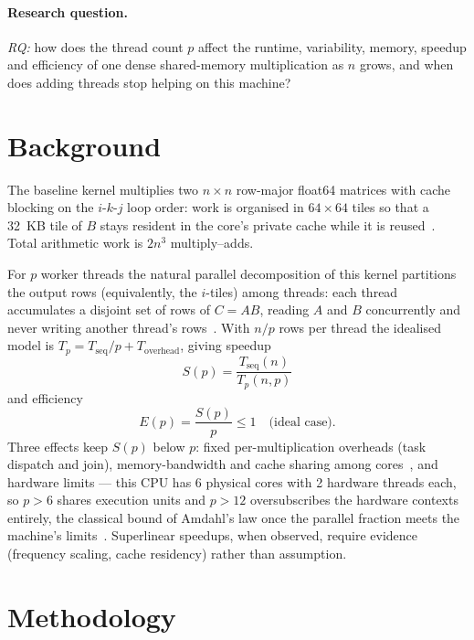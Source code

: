 \documentclass[11pt,a4paper]{article}
\begin{document}
\paragraph{Research question.}
\emph{RQ:} how does the thread count $p$ affect the runtime, variability,
memory, speedup and efficiency of one dense shared-memory multiplication as
$n$ grows, and when does adding threads stop helping on this machine?

\section{Background}
\label{sec:background}

The baseline kernel multiplies two $n \times n$ row-major float64 matrices
with cache blocking on the $i$-$k$-$j$ loop order: work is organised in
$64 \times 64$ tiles so that a 32~KB tile of $B$ stays resident in the
core's private cache while it is reused~\cite{lam1991,hennessy2017}. Total
arithmetic work is $2n^3$ multiply--adds.

For $p$ worker threads the natural parallel decomposition of this kernel
partitions the output rows (equivalently, the $i$-tiles) among threads:
each thread accumulates a disjoint set of rows of $C = AB$, reading $A$ and
$B$ concurrently and never writing another thread's
rows~\cite{lea2006}. With $n/p$ rows per thread the idealised model is
$T_p = T_{\mathrm{seq}}/p + T_{\mathrm{overhead}}$, giving speedup
\begin{equation}
S(p) = \frac{T_{\mathrm{seq}}(n)}{T_p(n, p)}
\end{equation}
and efficiency
\begin{equation}
E(p) = \frac{S(p)}{p} \le 1 \quad \text{(ideal case)}.
\end{equation}
Three effects keep $S(p)$ below $p$: fixed per-multiplication overheads
(task dispatch and join), memory-bandwidth and cache sharing among
cores~\cite{hennessy2017}, and hardware limits --- this CPU has 6 physical
cores with 2 hardware threads each, so $p > 6$ shares execution units and
$p > 12$ oversubscribes the hardware contexts entirely, the classical
bound of Amdahl's law once the parallel fraction meets the machine's
limits~\cite{amdahl1967,hill2008}. Superlinear
speedups, when observed, require evidence (frequency scaling, cache
residency) rather than assumption.

\section{Methodology}
\label{sec:methodology}
\end{document}
